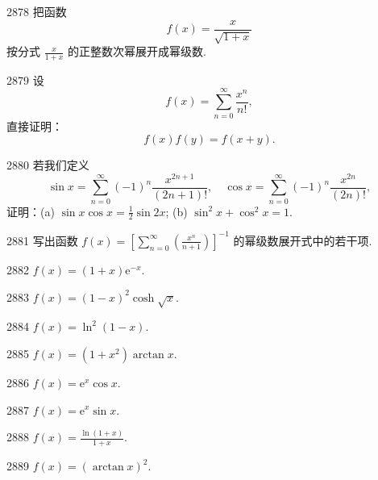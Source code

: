 \begin{prob}[S]{2878}
把函数
\[
f(x) = \frac{x}{\sqrt{1+x}}
\]
按分式 $\frac{x}{1+x}$ 的正整数次幂展开成幂级数.
\end{prob}

\begin{prob}[M]{2879}
设
\[
f(x) = \sum_{n=0}^{\infty} \frac{x^n}{n!},
\]
直接证明：
\[
f(x)f(y) = f(x+y).
\]
\end{prob}

\begin{prob}[M]{2880}
若我们定义
\[
\sin x = \sum_{n=0}^{\infty} (-1)^n \frac{x^{2n+1}}{(2n+1)!}, \quad \cos x = \sum_{n=0}^{\infty} (-1)^n \frac{x^{2n}}{(2n)!},
\]
证明：(a) $\sin x\cos x = \frac{1}{2}\sin 2x$; (b) $\sin^2 x + \cos^2 x = 1$.
\end{prob}

\begin{prob}[M]{2881}
写出函数 $f(x) = \left[\displaystyle\sum_{n=0}^{\infty} \left(\frac{x^n}{n+1}\right)\right]^{-1}$ 的幂级数展开式中的若干项.
\end{prob}


\begin{prob}[S]{2882}
$f(x) = (1+x)\mathrm{e}^{-x}$.
\end{prob}

\begin{prob}[S]{2883}
$f(x) = (1-x)^2\cosh\sqrt{x}$.
\end{prob}

\begin{prob}[S]{2884}
$f(x) = \ln^2(1-x)$.
\end{prob}

\begin{prob}[S]{2885}
$f(x) = (1+x^2)\arctan x$.
\end{prob}

\begin{prob}[S]{2886}
$f(x) = \mathrm{e}^x\cos x$.
\end{prob}

\begin{prob}[S]{2887}
$f(x) = \mathrm{e}^x\sin x$.
\end{prob}

\begin{prob}[S]{2888}
$f(x) = \frac{\ln(1+x)}{1+x}$.
\end{prob}

\begin{prob}[S]{2889}
$f(x) = (\arctan x)^2$.
\end{prob}

